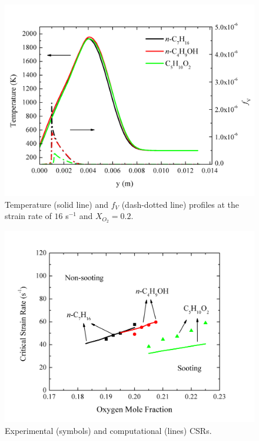 \begin{figure}[t]
  \centering
  \scriptsize
  \vspace{-0.1in}
  \includegraphics[width=1.0\textwidth]{ch-biofuel/Thermal.png}
  \normalsize
  \caption{Temperature (solid line) and $f_V$ (dash-dotted line) profiles at the strain rate of $16$ s$^{-1}$ and $X_{O_2}=0.2$.}
  \label{fig:thermal}
\end{figure}

\begin{figure}[t]
  \centering
  \scriptsize
  \vspace{0.5in}
  \includegraphics[width=1.0\textwidth]{ch-biofuel/Exp-Comp.png}
  \normalsize
  \caption{Experimental (symbols) and computational (lines) CSRs.}
  \label{fig:Exp-Comp}
\end{figure}


